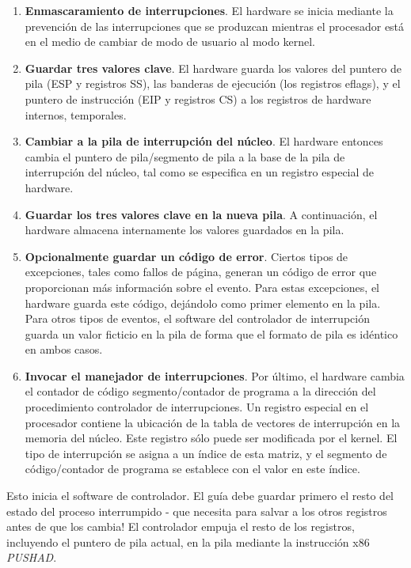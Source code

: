 \documentclass[10pt]{book}
\begin{document}
\begin{enumerate}
\item \textbf{Enmascaramiento de interrupciones}. El hardware se inicia mediante la prevención de las interrupciones que se produzcan mientras el procesador está en el medio de cambiar de modo de usuario al modo kernel.

\item \textbf{Guardar tres valores clave}. El hardware guarda los valores del puntero de pila ({\mf ESP} y registros {\mf SS}), las banderas de ejecución (los registros {\mf eflags}), y el puntero de instrucción ({\mf EIP} y registros {\mf CS}) a los registros de hardware internos, temporales.

\item \textbf{Cambiar a la pila de interrupción del núcleo}. El hardware entonces cambia el puntero de pila/segmento de pila a la base de la pila de interrupción del núcleo, tal como se especifica en un registro especial de hardware.

\item \textbf{Guardar los tres valores clave en la nueva pila}. A continuación, el hardware almacena internamente los valores guardados en la pila.

\item \textbf{Opcionalmente guardar un código de error}. Ciertos tipos de excepciones, tales como fallos de página, generan un código de error que proporcionan más información sobre el evento. Para estas excepciones, el hardware guarda este código, dejándolo como primer elemento en la pila. Para otros tipos de eventos, el software del controlador de interrupción guarda un valor ficticio en la pila de forma que el formato de pila es idéntico en ambos casos.

\item \textbf{Invocar el manejador de interrupciones}. Por último, el hardware cambia el contador de código segmento/contador de programa a la dirección del procedimiento controlador de interrupciones. Un registro especial en el procesador contiene la ubicación de la tabla de vectores de interrupción en la memoria del núcleo. Este registro sólo puede ser modificada por el kernel. El tipo de interrupción se asigna a un índice de esta matriz, y el segmento de código/contador de programa se establece con el valor en este índice.
\end{enumerate}

Esto inicia el software de controlador.
El guía debe guardar primero el resto del estado del proceso interrumpido - que necesita para salvar a los otros registros antes de que los cambia! El controlador empuja el resto de los registros, incluyendo el puntero de pila actual, en la pila mediante la instrucción {\mf x86} \textit{PUSHAD}.
\end{document}
